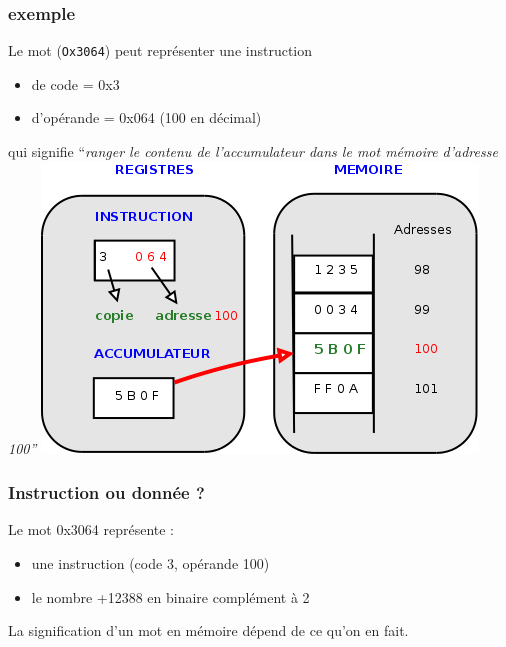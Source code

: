 \begin{frame}
  \frametitle{exemple}
Le mot  (\texttt{Ox3064})
peut représenter une \alert{instruction} 
\begin{itemize}
\item  de code  = 0x3 
\item d'opérande  = 0x064 (100 en décimal)
\end{itemize}
\begin{multicols}{2}
qui signifie  ``\emph{ranger le contenu de l'accumulateur dans le mot mémoire d'adresse 100''}
\includegraphics[width=1\linewidth]{figures/store-100.png}
\end{multicols}
\end{frame}

\begin{frame}
  \frametitle{Instruction ou donnée ?}

Le mot 0x3064 représente :
\begin{itemize}
\item une \alert{instruction} (code 3, opérande 100)
\item le \alert{nombre +12388} en binaire complément à 2 
\end{itemize}

La signification d'un mot en mémoire dépend de ce qu'on en fait.
\end{frame}


